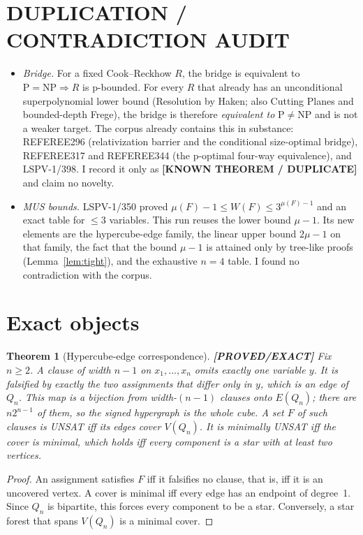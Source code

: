 \documentclass[11pt]{article}
\newtheorem{theorem}{Theorem}
\theoremstyle{remark}
\newcommand{\status}[1]{\textbf{[#1]}}
\begin{document}
\section{DUPLICATION / CONTRADICTION AUDIT}
\begin{itemize}
\item \emph{Bridge.} For a fixed Cook--Reckhow $R$, the bridge is equivalent to
$\mathrm P=\mathrm{NP}\Rightarrow R$ is p-bounded. For every $R$ that already has an unconditional
superpolynomial lower bound (Resolution by Haken; also Cutting Planes and bounded-depth Frege), the
bridge is therefore \emph{equivalent to} $\mathrm P\ne\mathrm{NP}$ and is not a weaker target. The
corpus already contains this in substance: REFEREE296 (relativization barrier and the conditional
size-optimal bridge), REFEREE317 and REFEREE344 (the p-optimal four-way equivalence), and
LSPV-1/398. I record it only as \status{KNOWN THEOREM / DUPLICATE} and claim no novelty.
\item \emph{MUS bounds.} LSPV-1/350 proved $\mu(F)-1\le W(F)\le 3^{\mu(F)-1}$ and an exact table for
$\le 3$ variables. This run reuses the lower bound $\mu-1$. Its new elements are the hypercube-edge
family, the linear upper bound $2\mu-1$ on that family, the fact that the bound $\mu-1$ is attained
only by tree-like proofs (Lemma~\ref{lem:tight}), and the exhaustive $n=4$ table. I found no
contradiction with the corpus.
\end{itemize}

\section{Exact objects}
\begin{theorem}[Hypercube-edge correspondence]\label{thm:corr}\status{PROVED/EXACT}
Fix $n\ge2$. A clause of width $n-1$ on $x_1,\dots,x_n$ omits exactly one variable $y$. It is
falsified by exactly the two assignments that differ only in $y$, which is an edge of $Q_n$. This map
is a bijection from width-$(n-1)$ clauses onto $E(Q_n)$; there are $n2^{n-1}$ of them, so the signed
hypergraph is the whole cube. A set $F$ of such clauses is UNSAT iff its edges cover $V(Q_n)$. It is
minimally UNSAT iff the cover is minimal, which holds iff every component is a star with at least two
vertices.
\end{theorem}
\begin{proof}
An assignment satisfies $F$ iff it falsifies no clause, that is, iff it is an uncovered vertex. A
cover is minimal iff every edge has an endpoint of degree~1. Since $Q_n$ is bipartite, this forces
every component to be a star. Conversely, a star forest that spans $V(Q_n)$ is a minimal cover.
\end{proof}
\end{document}
